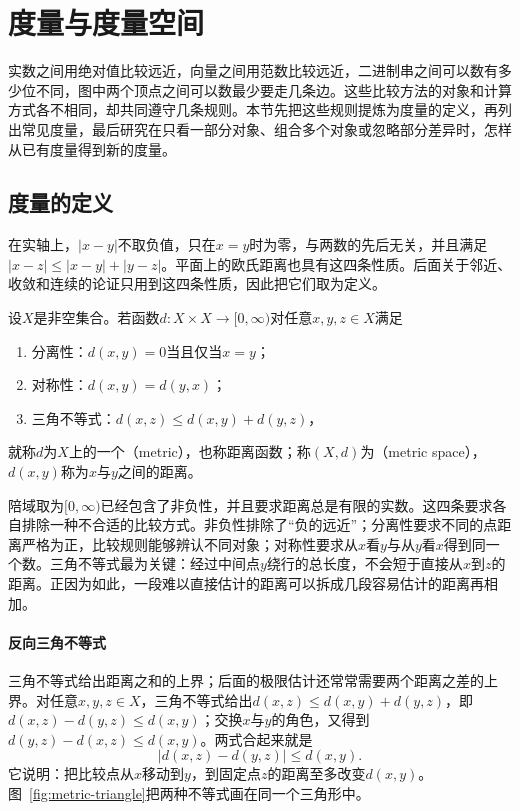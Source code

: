 \section{度量与度量空间}
\label{sec:metric-definition}

实数之间用绝对值比较远近，向量之间用范数比较远近，二进制串之间可以数有多少位不同，图中两个顶点之间可以数最少要走几条边。这些比较方法的对象和计算方式各不相同，却共同遵守几条规则。本节先把这些规则提炼为度量的定义，再列出常见度量，最后研究在只看一部分对象、组合多个对象或忽略部分差异时，怎样从已有度量得到新的度量。

\subsection{度量的定义}
\label{sec:metric-axioms}

在实轴上，$|x-y|$不取负值，只在$x=y$时为零，与两数的先后无关，并且满足$|x-z|\leq|x-y|+|y-z|$。平面上的欧氏距离也具有这四条性质。后面关于邻近、收敛和连续的论证只用到这四条性质，因此把它们取为定义。

\begin{definition}[度量与度量空间]
\label{def:metric-space}
设$X$是非空集合。若函数$d:X\times X\to[0,\infty)$对任意$x,y,z\in X$满足
\begin{enumerate}
  \item 分离性：$d(x,y)=0$当且仅当$x=y$；
  \item 对称性：$d(x,y)=d(y,x)$；
  \item 三角不等式：$d(x,z)\leq d(x,y)+d(y,z)$，
\end{enumerate}
就称$d$为$X$上的一个（metric），也称距离函数；称$(X,d)$为（metric space），$d(x,y)$称为$x$与$y$之间的距离。
\end{definition}

陪域取为$[0,\infty)$已经包含了非负性，并且要求距离总是有限的实数。这四条要求各自排除一种不合适的比较方式。非负性排除了“负的远近”；分离性要求不同的点距离严格为正，比较规则能够辨认不同对象；对称性要求从$x$看$y$与从$y$看$x$得到同一个数。三角不等式最为关键：经过中间点$y$绕行的总长度，不会短于直接从$x$到$z$的距离。正因为如此，一段难以直接估计的距离可以拆成几段容易估计的距离再相加。

\paragraph{反向三角不等式}
三角不等式给出距离之和的上界；后面的极限估计还常常需要两个距离之差的上界。对任意$x,y,z\in X$，三角不等式给出$d(x,z)\leq d(x,y)+d(y,z)$，即$d(x,z)-d(y,z)\leq d(x,y)$；交换$x$与$y$的角色，又得到$d(y,z)-d(x,z)\leq d(x,y)$。两式合起来就是
\begin{equation}
\label{eq:metric-reverse-triangle}
  \bigl|d(x,z)-d(y,z)\bigr|\leq d(x,y).
\end{equation}
它说明：把比较点从$x$移动到$y$，到固定点$z$的距离至多改变$d(x,y)$。图~\ref{fig:metric-triangle}把两种不等式画在同一个三角形中。

